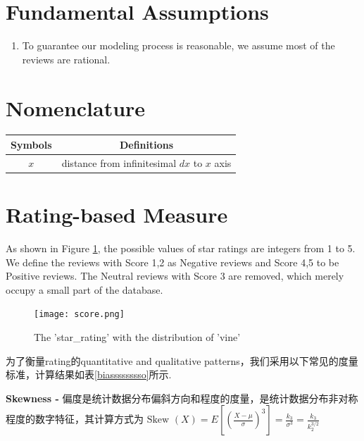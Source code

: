 \documentclass[12pt]{article}%
\begin{document}
\section{Fundamental Assumptions}
\begin{enumerate}
	\item  To guarantee our modeling process is reasonable, we assume most of the reviews are rational.  
\end{enumerate}

\section{Nomenclature}

	\begin{table}[H]
	\label{biao} \centering
	\begin{tabular}{cc}
		\toprule[1.5pt]
		\multicolumn{1}{m{3cm}}{\centering Symbols} & \multicolumn{1}{m{10cm}}{\centering Definitions} \\
		\midrule[1pt]
		$x$	 &  distance from infinitesimal $dx$ to $x$ axis\\
		\bottomrule[1.5pt]
	\end{tabular}
\end{table}


\section{Rating-based Measure}
	As shown in Figure \ref{scosssre}, the possible values of star ratings are integers from 1 to 5. We define the reviews with Score 1,2 as Negative reviews and Score 4,5 to be Positive reviews. The Neutral reviews with Score 3 are removed, which merely occupy a small part of the database.

	
\begin{figure}[H]
	\centering
	\texttt{[image: score.png]}%
	\caption{The 'star\_rating' with the distribution of 'vine'	}\label{scosssre}%
\end{figure}

为了衡量rating的quantitative and qualitative patterns，我们采用以下常见的度量标准，计算结果如表\ref{biasssssssso}所示.

\textbf{Skewness -} 偏度是统计数据分布偏斜方向和程度的度量，是统计数据分布非对称程度的数字特征，其计算方式为$\text { Skew }(X)=E\left[\left(\frac{X-\mu}{\sigma}\right)^{3}\right]=\frac{k_{3}}{\sigma^{3}}=\frac{k_{3}}{k_{2}^{3 / 2}}
$
\end{document}
